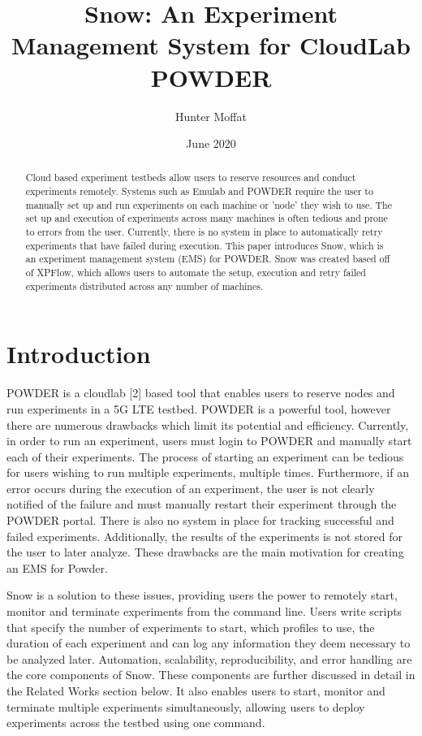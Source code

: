 \documentclass[11pt,twocolumn,letterpaper]{article}
\title{Snow: An Experiment Management System for CloudLab POWDER}
\author{Hunter Moffat}
\date{June 2020}
\begin{document}
\maketitle

\begin{abstract}
Cloud based experiment testbeds allow users to reserve resources and conduct experiments remotely.  Systems such as Emulab and POWDER require the user to manually set up and run experiments on each machine or 'node' they wish to use.  The set up and execution of experiments across many machines is often tedious and prone to errors from the user.  Currently, there is no system in place to automatically retry experiments that have failed during execution.  This paper introduces Snow, which is an experiment management system (EMS) for POWDER. Snow was created based off of XPFlow, which allows users to automate the setup, execution and retry failed experiments distributed across any number of machines.
\end{abstract}

\section{Introduction}

POWDER is a cloudlab [2] based tool that enables users to reserve nodes and run experiments in a 5G LTE testbed. POWDER is a powerful tool, however there are numerous drawbacks which limit its potential and efficiency. Currently, in order to run an experiment, users must login to POWDER and manually start each of their experiments.  The process of starting an experiment can be tedious for users wishing to run multiple experiments, multiple times.  Furthermore, if an error occurs during the execution of an experiment, the user is not clearly notified of the failure and must manually restart their experiment through the POWDER portal.  There is also no system in place for tracking successful and failed experiments.  Additionally, the results of the experiments is not stored for the user to later analyze.  These drawbacks are the main motivation for creating an EMS for Powder.

Snow is a solution to these issues, providing users the power to remotely start, monitor and terminate experiments from the command line.  Users write scripts that specify the number of experiments to start, which profiles to use, the duration of each experiment and can log any information they deem necessary to be analyzed later.  Automation, scalability, reproducibility, and error handling are the core components of Snow. These components are further discussed in detail in the Related Works section below. It also enables users to start, monitor and terminate multiple experiments simultaneously, allowing users to deploy experiments across the testbed using one command.
\end{document}
